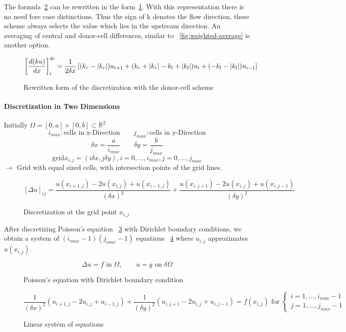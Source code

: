The formula~\ref{fig:dcs-method} can be rewritten in the form~\ref{fig:dcs-method-rewritten}. With this representation there is no need fore case distinctions. Thus the sign of k denotes the flow direction, these scheme always selects the value which lies in the upstream direction. An averaging of central and donor-cell differences, similar to ~\ref{fig:weighted-average} is another option.
\begin{figure}[H]
	\centering
	\[ \left[\frac{d(k u)}{d x}\right]^{dc}_i = \frac{1}{2 \delta x} \left[ (k_r - \lvert k_r\rvert) u_{i+1} + (k_r + \lvert k_r\rvert-k_l +\lvert k_l\rvert) u_i  + (-k_l -\lvert k_l\rvert)u_{i-1} \right] \]
	\renewcommand{\thefigure}{3.12}
	\caption{Rewritten form of the discretization with the donor-cell scheme}
	\label{fig:dcs-method-rewritten}
\end{figure}

\paragraph{Discretization in Two Dimensions}
Initially $\Omega = [0,a] \times [0,b] \subset \mathds{R}^2$
\[i_{max} : \text{cells in x-Direction} \qquad j_{max} : \text{cells in y-Direction}\]
\[\delta x  = \frac{a}{i_{max}} \qquad \delta y = \frac{b}{j_{max}}\]
\[\text{grid} x_{i,j} = (i \delta x, j \delta y), i = 0, \dots, i_{max}, j = 0, \dots, j_{max} \]
$\rightarrow$ Grid with equal sized cells, with intersection points of the grid lines.

\begin{figure}[H]
	\centering
	\[ [\Delta u]_{ij} = \frac{u(x_{i+1,j}) - 2u(x_{i,j}) + u(x_{i-1,j})}{(\delta x)^2} + \frac{u(x_{i,j+1}) - 2u(x_{i,j}) + u(x_{i,j-1})}{(\delta y)^2}\]
	\renewcommand{\thefigure}{3.13}
	\caption{Discretization at the grid point $x_{i,j}$}
	\label{fig:dcs-method}
\end{figure}

After discretizing Poisson's equation ~\ref{fig:pe-dirich} with Dirichlet boundary conditions, we obtain  a system of $(i_{max}-1)(j_{max}-1)$ equations ~\ref{fig:sys-of-eq} where $u_{i,j}$ approximates $u(x_{i,j})$.
\begin{figure}[H]
	\centering
	\[ \Delta u = f \text{ in } \Omega, \qquad u = g \text{ on } \delta\Omega\]
	\renewcommand{\thefigure}{3.14}
	\caption{Poisson's equation with Dirichlet boundary condition}
	\label{fig:pe-dirich}
\end{figure}

\begin{figure}[H]
	\centering
	\[ \frac{1}{(\delta x)^2} (u_{i+1,j} - 2u_{i,j} + u_{i-1,j}) + \frac{1}{(\delta y)^2} (u_{i,j+1} - 2u_{i,j} + u_{i,j-1}) = f(x_{i,j}) \text{ for } \begin{cases}
	i = 1, \dots, i_{max}-1 \\
	j = 1, \dots, j_{max}-1
\end{cases} \]
	\renewcommand{\thefigure}{3.15}
	\caption{Linear system of equations}
	\label{fig:sys-of-eq}
\end{figure}



